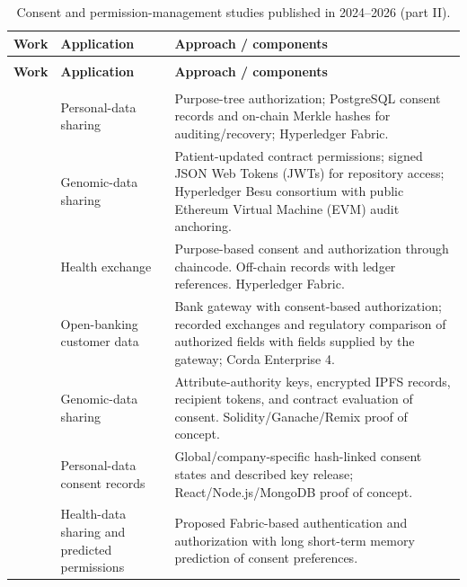 \begin{longtable}{@{}>{\raggedright\arraybackslash}m{}>{\raggedright\arraybackslash}m{}>{\raggedright\arraybackslash}m{}@{}}
\caption{Consent and permission-management studies published in 2024--2026 (part II).}\label{tab:consent-works-2} \\
\toprule
\textbf{Work} & \textbf{Application} & \textbf{Approach / components} \\
\midrule
\endfirsthead
\multicolumn{3}{l}{\tablename\ \thetable\ (continued)} \\
\toprule
\textbf{Work} & \textbf{Application} & \textbf{Approach / components} \\
\midrule
\endhead
\multicolumn{3}{r}{Continued on the next page} \\
\endfoot
\bottomrule
\endlastfoot
\cite{updateCan2024AuditableConsent} & Personal-data sharing & Purpose-tree authorization; PostgreSQL consent records and on-chain Merkle hashes for auditing/recovery; Hyperledger Fabric. \\
\addlinespace[5pt]
\cite{updateJaved2024SecureConsent} & Genomic-data sharing & Patient-updated contract permissions; signed JSON Web Tokens (JWTs) for repository access; Hyperledger Besu consortium with public Ethereum Virtual Machine (EVM) audit anchoring. \\
\addlinespace[5pt]
\cite{updateRohini2024SmartConsent} & Health exchange & Purpose-based consent and authorization through chaincode. Off-chain records with ledger references. Hyperledger Fabric. \\
\addlinespace[5pt]
\cite{updateGhosh2024Banking} & Open-banking customer data & Bank gateway with consent-based authorization; recorded exchanges and regulatory comparison of authorized fields with fields supplied by the gateway; Corda Enterprise 4. \\
\addlinespace[5pt]
\cite{updateRao2024Genomic} & Genomic-data sharing & Attribute-authority keys, encrypted IPFS records, recipient tokens, and contract evaluation of consent. Solidity/Ganache/Remix proof of concept. \\
\addlinespace[5pt]
\cite{updateAyala2024DataConsent} & Personal-data consent records & Global/company-specific hash-linked consent states and described key release; React/Node.js/MongoDB proof of concept. \\
\addlinespace[5pt]
\cite{updateDeepthika2024ConsentLSTM} & Health-data sharing and predicted permissions & Proposed Fabric-based authentication and authorization with long short-term memory prediction of consent preferences. \\

\end{longtable}
